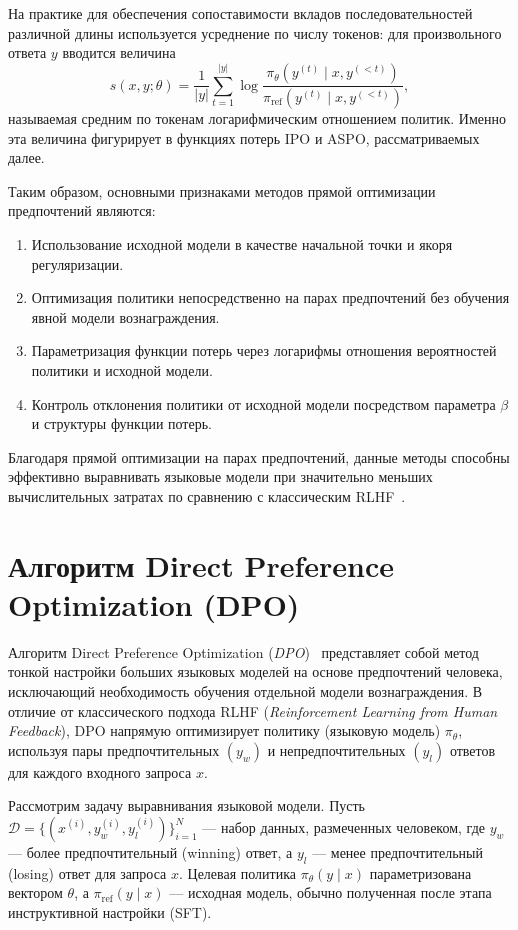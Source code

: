\documentclass[a4paper,12pt]{article}
\begin{document}
На практике для обеспечения сопоставимости вкладов последовательностей различной длины используется усреднение по числу токенов: для произвольного ответа $y$ вводится величина
\[
s(x, y; \theta) = \frac{1}{|y|} \sum_{t=1}^{|y|} \log \frac{\pi_\theta(y^{(t)} \mid x, y^{(<t)})}{\pi_{\text{ref}}(y^{(t)} \mid x, y^{(<t)})},
\]
называемая средним по токенам логарифмическим отношением политик. Именно эта величина фигурирует в функциях потерь IPO и ASPO, рассматриваемых далее.

Таким образом, основными признаками методов прямой оптимизации предпочтений являются:

\begin{enumerate}
    \item Использование исходной модели в качестве начальной точки и якоря регуляризации.
    \item Оптимизация политики непосредственно на парах предпочтений без обучения явной модели вознаграждения.
    \item Параметризация функции потерь через логарифмы отношения вероятностей политики и исходной модели.
    \item Контроль отклонения политики от исходной модели посредством параметра $\beta$ и структуры функции потерь.
\end{enumerate}

Благодаря прямой оптимизации на парах предпочтений, данные методы способны эффективно выравнивать языковые модели при значительно меньших вычислительных затратах по сравнению с классическим RLHF~\cite{rafailov2023direct}.

\section{Алгоритм Direct Preference Optimization (DPO)}

Алгоритм Direct Preference Optimization (\textit{DPO})~\cite{rafailov2023direct} представляет собой метод тонкой настройки больших языковых моделей на основе предпочтений человека, исключающий необходимость обучения отдельной модели вознаграждения. В отличие от классического подхода RLHF (\textit{Reinforcement Learning from Human Feedback}), DPO напрямую оптимизирует политику (языковую модель) $\pi_\theta$, используя пары предпочтительных $(y_w)$ и непредпочтительных $(y_l)$ ответов для каждого входного запроса $x$.

Рассмотрим задачу выравнивания языковой модели. Пусть $\mathcal{D} = \{(x^{(i)}, y_w^{(i)}, y_l^{(i)})\}_{i=1}^N$ — набор данных, размеченных человеком, где $y_w$ — более предпочтительный (winning) ответ, а $y_l$ — менее предпочтительный (losing) ответ для запроса $x$. Целевая политика $\pi_\theta(y \mid x)$ параметризована вектором $\theta$, а $\pi_{\text{ref}}(y \mid x)$ — исходная модель, обычно полученная после этапа инструктивной настройки (SFT).
\end{document}
